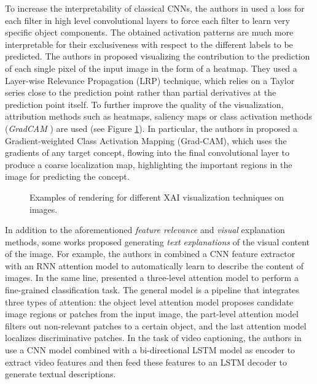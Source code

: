 \documentclass[final]{elsarticle}
\begin{document}
To increase the interpretability of classical CNNs, the authors in \cite{InterpretableCNN} used a loss for each filter in high level convolutional layers to force each filter to learn very specific object components. The obtained activation patterns are much more interpretable for their exclusiveness with respect to the different labels to be predicted. The authors in \cite{LayerWise} proposed visualizing the contribution to the prediction of each single pixel of the input image in the form of a heatmap. They used a Layer-wise Relevance Propagation (LRP) technique, which relies on a Taylor series close to the prediction point rather than partial derivatives at the prediction point itself. To further improve the quality of the visualization, attribution methods such as heatmaps, saliency maps or class activation methods (\textit{GradCAM} \cite{selvaraju2017grad}) are used (see Figure \ref{fig:visualisation}). In particular, the authors in \cite{selvaraju2017grad} proposed a Gradient-weighted Class Activation Mapping (Grad-CAM), which uses the gradients of any target concept, flowing into the final convolutional layer to produce a coarse localization map, highlighting the important regions in the image for predicting the concept.
\begin{figure}[htbp!]
\centering
{}
  \caption{Examples of rendering for different XAI visualization techniques on images.\label{fig:visualisation}}
\end{figure}

In addition to the aforementioned {\it feature relevance} and {\it visual} explanation methods, some works proposed generating  \textit{text explanations} of the visual content of the image. For example, the authors in \cite{xu2015show} combined a CNN feature extractor with an RNN attention model to automatically learn to describe the content of images. In the same line, \cite{xiao2015application} presented a three-level attention model to perform a fine-grained classification task. The general model is a pipeline that integrates three types of attention: the object level attention model proposes candidate image regions or patches from the input image, the part-level attention model filters out non-relevant patches to a certain object, and the last attention model localizes discriminative patches. In the task of video captioning, the authors in \cite{ImprovingInterpretability} use a CNN model combined with a bi-directional LSTM model as encoder to extract video features and then feed these features to an LSTM decoder to generate textual descriptions. 
\end{document}
